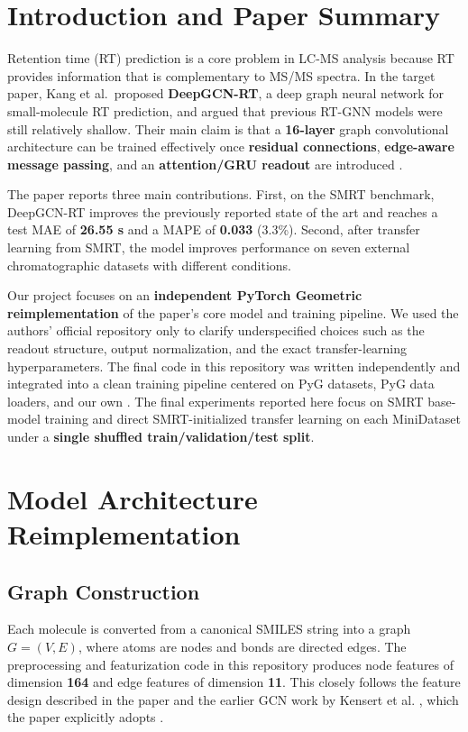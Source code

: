
\section{Introduction and Paper Summary}

Retention time (RT) prediction is a core problem in LC-MS analysis because RT provides information that is complementary to MS/MS spectra. In the target paper, Kang et al.\ proposed \textbf{DeepGCN-RT}, a deep graph neural network for small-molecule RT prediction, and argued that previous RT-GNN models were still relatively shallow. Their main claim is that a \textbf{16-layer} graph convolutional architecture can be trained effectively once \textbf{residual connections}, \textbf{edge-aware message passing}, and an \textbf{attention/GRU readout} are introduced \cite{kang2023deepgcnrt}.

The paper reports three main contributions. First, on the SMRT benchmark, DeepGCN-RT improves the previously reported state of the art and reaches a test MAE of \textbf{26.55 s} and a MAPE of \textbf{0.033} (3.3\%). Second, after transfer learning from SMRT, the model improves performance on seven external chromatographic datasets with different conditions.

Our project focuses on an \textbf{independent PyTorch Geometric reimplementation} of the paper's core model and training pipeline. We used the authors' official repository only to clarify underspecified choices such as the readout structure, output normalization, and the exact transfer-learning hyperparameters. The final code in this repository was written independently and integrated into a clean training pipeline centered on PyG datasets, PyG data loaders, and our own . The final experiments reported here focus on SMRT base-model training and direct SMRT-initialized transfer learning on each MiniDataset under a \textbf{single shuffled train/validation/test split}.

\section{Model Architecture Reimplementation}

\subsection{Graph Construction}

Each molecule is converted from a canonical SMILES string into a graph
\(
G = (V, E)
\),
where atoms are nodes and bonds are directed edges. The preprocessing and featurization code in this repository produces node features of dimension \textbf{164} and edge features of dimension \textbf{11}. This closely follows the feature design described in the paper and the earlier GCN work by Kensert et al. \cite{kensert2021}, which the paper explicitly adopts \cite{kang2023deepgcnrt}.

